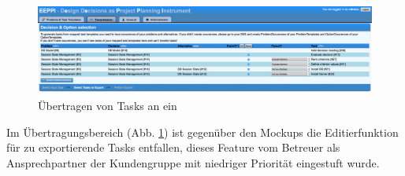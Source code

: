 			
		\begin{figure}[H]
			\centering
			\includegraphics[width=\linewidth]{tutorial/img/transmit2.png}
			\caption{Übertragen von Tasks an ein \ppt}
			\label{fig:eeppiTransmissionScreen}
		\end{figure}	
		
		Im Übertragungsbereich (Abb. \ref{fig:eeppiTransmissionScreen}) ist gegenüber den Mockups die Editierfunktion für zu exportierende Tasks entfallen,
		dieses Feature vom Betreuer als Ansprechpartner der Kundengruppe mit niedriger Priorität eingestuft wurde.